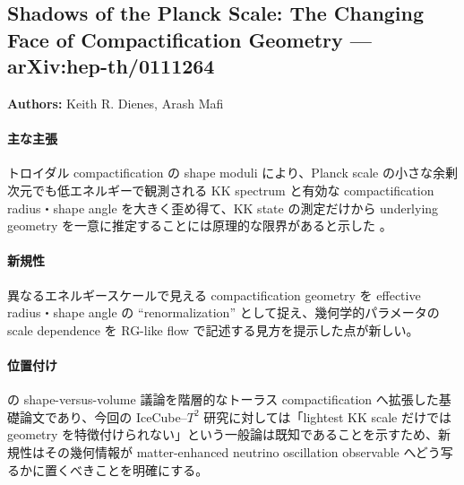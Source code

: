 \subsection{Shadows of the Planck Scale: The Changing Face of Compactification Geometry --- arXiv:hep-th/0111264}

\textbf{Authors:} Keith R. Dienes, Arash Mafi

\paragraph{主な主張}
トロイダル compactification の shape moduli により、Planck scale の小さな余剰次元でも低エネルギーで観測される KK spectrum と有効な compactification radius・shape angle を大きく歪め得て、KK state の測定だけから underlying geometry を一意に推定することには原理的な限界があると示した \cite{DienesMafi:2001shadows}。

\paragraph{新規性}
異なるエネルギースケールで見える compactification geometry を effective radius・shape angle の ``renormalization'' として捉え、幾何学的パラメータの scale dependence を RG-like flow で記述する見方を提示した点が新しい。

\paragraph{位置付け}
\cite{Dienes:2001shape} の shape-versus-volume 議論を階層的なトーラス compactification へ拡張した基礎論文であり、今回の IceCube--$T^2$ 研究に対しては「lightest KK scale だけでは geometry を特徴付けられない」という一般論は既知であることを示すため、新規性はその幾何情報が matter-enhanced neutrino oscillation observable へどう写るかに置くべきことを明確にする。
